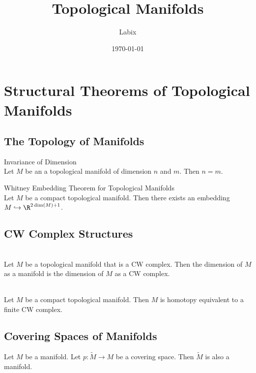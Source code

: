 \documentclass[a4paper]{article}
\title{Topological Manifolds}
\author{Labix}
\date{\today}
\begin{document}
\maketitle
\begin{abstract}
\end{abstract}
\pagebreak
\tableofcontents
\pagebreak

\section{Structural Theorems of Topological Manifolds}
\subsection{The Topology of Manifolds}
\begin{thm}{Invariance of Dimension}{}\\
Let $M$ be an a topological manifold of dimension $n$ and $m$. Then $n=m$. 
\end{thm}

\begin{thm}{Whitney Embedding Theorem for Topological Manifolds}{}\\
Let $M$ be a compact topological manifold. Then there exists an embedding $M\hookrightarrow\R^{2\dim(M)+1}$. 
\end{thm}

\subsection{CW Complex Structures}
\begin{prp}{}{}\\
Let $M$ be a topological manifold that is a CW complex. Then the dimension of $M$ as a manifold is the dimension of $M$ as a CW complex. 
\end{prp}

\begin{prp}{}{}\\
Let $M$ be a compact topological manifold. Then $M$ is homotopy equivalent to a finite CW complex. 
\end{prp}

\subsection{Covering Spaces of Manifolds}
\begin{prp}{}{} Let $M$ be a manifold. Let $p:\widetilde{M}\to M$ be a covering space. Then $\widetilde{M}$ is also a manifold. 
\end{prp}
\end{document}
